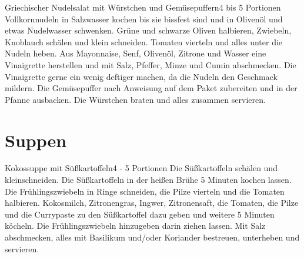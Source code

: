 \documentclass[a4paper,10pt]{article}
\begin{document}
    \begin{recipe}{Griechischer Nudelsalat mit Würstchen und Gemüsepuffern}{4 bis 5 Portionen}{}
        Vollkornnudeln in Salzwasser kochen bis sie bissfest sind und in Olivenöl und etwas Nudelwasser schwenken.
        Grüne und schwarze Oliven halbieren, Zwiebeln, Knoblauch schälen und klein schneiden. 
        Tomaten vierteln und alles unter die Nudeln heben.
        Aus Mayonnaise, Senf, Olivenöl, Zitrone und Wasser eine Vinaigrette herstellen und mit Salz,
        Pfeffer, Minze und Cumin abschmecken. Die Vinaigrette gerne ein wenig deftiger machen,
        da die Nudeln den Geschmack mildern.
        Die Gemüsepuffer nach Anweisung auf dem Paket zubereiten und in der Pfanne ausbacken.
        Die Würstchen braten und alles zusammen servieren.
    \end{recipe}

    \newpage    
    
    \section{Suppen}
    
    \begin{recipe}{Kokossuppe mit Süßkartoffeln}{4 - 5 Portionen}{}
        Die Süßkartoffeln schälen und kleinschneiden. Die Süßkartoffeln in der 
        heißen Brühe 5 Minuten kochen lassen.
        Die Frühlingszwiebeln in Ringe schneiden, die Pilze vierteln und die Tomaten halbieren.
        Kokosmilch, Zitronengras, Ingwer, Zitronensaft, die Tomaten, die Pilze und die Currypaste zu den
        Süßkartoffel dazu geben und weitere 5 Minuten köcheln. Die Frühlingszwiebeln hinzugeben darin 
        ziehen lassen.
        Mit Salz abschmecken, alles mit Basilikum und/oder Koriander bestreuen, unterheben und servieren.
    \end{recipe}
    
\end{document}
